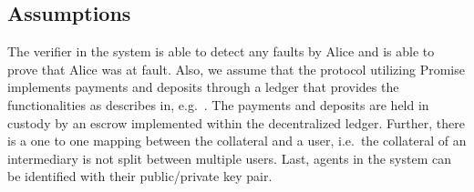 \documentclass[runningheads]{llncs}
\newcommand{\sys}{Promise\xspace}
\begin{document}

\subsection{Assumptions}

The verifier in the system is able to detect any faults by Alice and is able to prove that Alice was at fault.
Also, we assume that the protocol utilizing \sys implements payments and deposits through a ledger that provides the functionalities as describes in, e.g.~\cite{Badertscher2018Genesis}.
The payments and deposits are held in custody by an escrow implemented within the decentralized ledger.
Further, there is a one to one mapping between the collateral and a user, i.e.\ the collateral of an intermediary is not split between multiple users.
Last, agents in the system can be identified with their public/private key pair.



\end{document}
